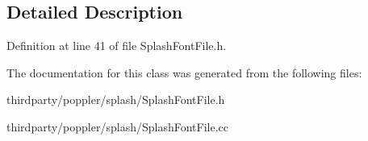 \subsection{Detailed Description}


Definition at line 41 of file Splash\+Font\+File.\+h.



The documentation for this class was generated from the following files\+:\begin{DoxyCompactItemize}
\item 
thirdparty/poppler/splash/Splash\+Font\+File.\+h\item 
thirdparty/poppler/splash/Splash\+Font\+File.\+cc\end{DoxyCompactItemize}
